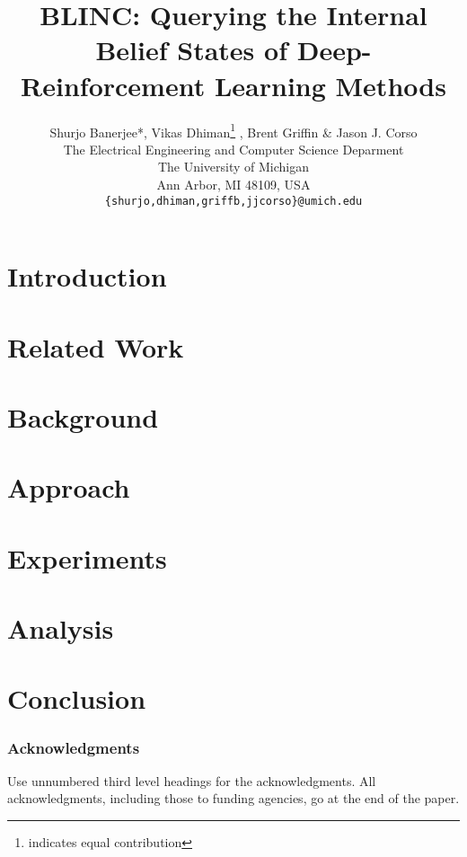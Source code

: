 \documentclass[]{article} %
\title{BLINC: Querying the Internal Belief States of Deep-Reinforcement Learning Methods}
\author{Shurjo Banerjee*, Vikas Dhiman\thanks{indicates equal contribution} , Brent Griffin \& Jason J. Corso  \\
The Electrical Engineering and Computer Science Deparment\\
The University of Michigan\\
Ann Arbor, MI 48109, USA \\
\texttt{\{shurjo,dhiman,griffb,jjcorso\}@umich.edu} \\
}
\begin{document}
\maketitle

\begin{abstract}

\end{abstract}

\section{Introduction}


\section{Related Work}


\section{Background}


\section{Approach}


\section{Experiments}


\section{Analysis}


\section{Conclusion}



\subsubsection*{Acknowledgments}

Use unnumbered third level headings for the acknowledgments. All
acknowledgments, including those to funding agencies, go at the end of the paper.


\end{document}
